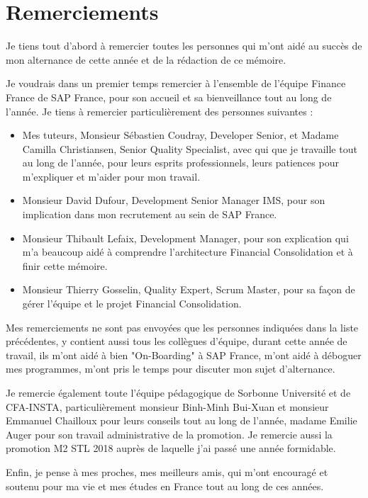 \section{Remerciements}
Je tiens tout d'abord à remercier toutes les personnes qui m'ont aidé au succès de mon alternance de cette année et de la rédaction de ce mémoire.

\par Je voudrais dans un premier temps remercier à l'ensemble de l'équipe Finance France de SAP France, pour son accueil et sa bienveillance tout au long de l'année. Je tiens à remercier particulièrement des personnes suivantes : 
\begin{itemize}
    \item Mes tuteurs, Monsieur Sébastien Coudray, Developer Senior, et Madame Camilla Christiansen, Senior Quality Specialist, avec qui que je travaille tout au long de l'année, pour leurs esprits professionnels, leurs patiences pour m'expliquer et m'aider pour mon travail.
    \item Monsieur David Dufour, Development Senior Manager IMS, pour son implication dans mon recrutement au sein de SAP France.
    \item Monsieur Thibault Lefaix, Development Manager, pour son explication qui m'a beaucoup aidé à comprendre l'architecture Financial Consolidation et à finir cette mémoire.
    \item Monsieur Thierry Gosselin, Quality Expert, Scrum Master, pour sa façon de gérer l'équipe et le projet Financial Consolidation.
\end{itemize}

\par Mes remerciements ne sont pas envoyées que les personnes indiquées dans la liste précédentes, y contient aussi tous les collègues d'équipe, durant cette année de travail, ils m'ont aidé à bien "On-Boarding" à SAP France, m'ont aidé à déboguer mes programmes, m'ont pris le temps pour discuter mon sujet d'alternance. 

\par Je remercie également toute l'équipe pédagogique de Sorbonne Université et de CFA-INSTA, particulièrement monsieur Binh-Minh Bui-Xuan et monsieur Emmanuel Chailloux pour leurs conseils
tout au long de l’année, madame Emilie Auger pour son travail administrative de la promotion. Je remercie aussi la promotion M2 STL 2018 auprès de laquelle j’ai passé une année formidable.

\par Enfin, je pense à mes proches, mes meilleurs amis, qui m'ont encouragé et soutenu pour ma vie et mes études en France tout au long de ces années.


